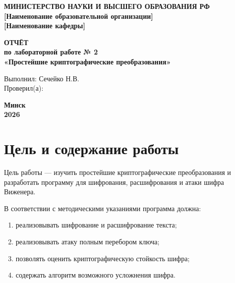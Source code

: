 \documentclass[a4paper,14pt,oneside]{extarticle}
\begin{document}

\begin{titlepage}
\begin{center}
\textbf{МИНИСТЕРСТВО НАУКИ И ВЫСШЕГО ОБРАЗОВАНИЯ РФ}\\
\vspace{0.4cm}
\textbf{[Наименование образовательной организации]}\\
\textbf{[Наименование кафедры]}

\vfill

\textbf{\Large ОТЧЁТ}\\
\vspace{0.4cm}
\textbf{\large по лабораторной работе № 2}\\
\vspace{0.4cm}
\textbf{\large «Простейшие криптографические преобразования»}

\vfill

\begin{flushright}
\begin{minipage}{0.48\textwidth}
Выполнил: Сечейко Н.В.\\
\vspace{0.3cm}
Проверил(а): \underline{\hspace{4cm}}
\end{minipage}
\end{flushright}

\vfill

\textbf{Минск}\\
\textbf{2026}
\end{center}
\end{titlepage}

\tableofcontents
\newpage

\section{Цель и содержание работы}

Цель работы --- изучить простейшие криптографические преобразования и
разработать программу для шифрования, расшифрования и атаки шифра Виженера.

В соответствии с методическими указаниями программа должна:
\begin{enumerate}
\item реализовывать шифрование и расшифрование текста;
\item реализовывать атаку полным перебором ключа;
\item позволять оценить криптографическую стойкость шифра;
\item содержать алгоритм возможного усложнения шифра.
\end{enumerate}
\end{document}
